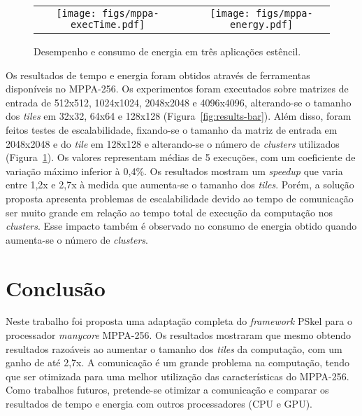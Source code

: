 \documentclass[12pt]{article}
\newcommand{\pskel}{{\small \textsf{PSkel}}\xspace}
\newcommand{\mppa}{{\small \textsf{MPPA-256}}\xspace}
\begin{document}
\begin{figure}[t]
	\begin{center}
		\begin{tabular}{ccc}
	        \texttt{[image: figs/mppa-execTime.pdf]} & & \texttt{[image: figs/mppa-energy.pdf]}
		\end{tabular}
      \vspace{-2ex}
        \caption{Desempenho e consumo de energia em três aplicações estêncil.}\label{fig:results-line}
	\end{center}
  \vspace{-2ex}
\end{figure}

Os resultados de tempo e energia foram obtidos através de ferramentas disponíveis no \mppa. Os experimentos foram executados sobre matrizes de entrada de 512x512, 1024x1024, 2048x2048 e 4096x4096, alterando-se o tamanho dos \textit{tiles} em 32x32, 64x64 e 128x128 (Figura~\ref{fig:results-bar}). Além disso, foram feitos testes de escalabilidade, fixando-se o tamanho da matriz de entrada em 2048x2048 e do \textit{tile} em 128x128 e alterando-se o número de \textit{clusters} utilizados (Figura~\ref{fig:results-line}). Os valores representam médias de 5 execuções, com um coeficiente de variação máximo inferior à 0,4\%. Os resultados mostram um \textit{speedup} que varia entre 1,2x e 2,7x à medida que aumenta-se o tamanho dos \textit{tiles}. Porém, a solução proposta apresenta problemas de escalabilidade devido ao tempo de comunicação ser muito grande em relação ao tempo total de execução da computação nos \textit{clusters}. Esse impacto também é observado no consumo de energia obtido quando aumenta-se o número de \textit{clusters}.

\section{Conclusão}
\label{sec:conclusao}

Neste trabalho foi proposta uma adaptação completa do \textit{framework} \pskel para o processador \textit{manycore} \mppa. Os resultados mostraram que mesmo obtendo resultados razoáveis ao aumentar o tamanho dos  \textit{tiles} da computação, com um ganho de até 2,7x. A comunicação é um grande problema na computação, tendo que ser otimizada para uma melhor utilização das características do \mppa. Como trabalhos futuros, pretende-se otimizar a comunicação e comparar os resultados de tempo e energia com outros processadores (CPU e GPU).



\end{document}
